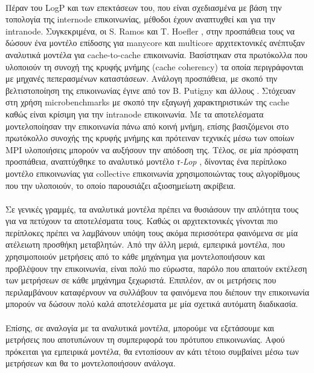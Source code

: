 \paragraph{}
Πέραν του LogP και των επεκτάσεων του, που είναι σχεδιασμένα με βάση την τοπολογία της internode επικοινωνίας, μέθοδοι έχουν αναπτυχθεί και για την intranode. Συγκεκριμένα, οι S. Ramos και T. Hoefler \cite{ramos2013modeling}, στην προσπάθεια τους να δώσουν ένα μοντέλο επίδοσης για manycore και multicore αρχιτεκτονικές ανέπτυξαν αναλυτικά μοντέλα για cache-to-cache επικοινωνία. Βασίστηκαν στα πρωτόκολλα που υλοποιούν τη συνοχή της κρυφής μνήμης (cache coherency) τα οποία περιγράφονται με μηχανές πεπερασμένων καταστάσεων. Ανάλογη προσπάθεια, με σκοπό την βελτιστοποίηση της επικοινωνίας έγινε από τον Β. Putigny και άλλους \cite{putigny}. Στόχευαν στη χρήση microbenchmarks με σκοπό την εξαγωγή χαρακτηριστικών της cache καθώς είναι κρίσιμη για την intranode επικοινωνία. Με τα αποτελέσματα μοντελοποίησαν την επικοινωνία πάνω από κοινή μνήμη, επίσης βασιζόμενοι στο πρωτόκολλο συνοχής της κρυφής μνήμης και πρότειναν τεχνικές μέσω των οποίων MPI υλοποιήσεις μπορούν να αυξήσουν την απόδοση της. Τέλος, σε μία πρόσφατη προσπάθεια, αναπτύχθηκε το αναλυτικό μοντέλο \textit{τ-Lop} \cite{tlop}, δίνοντας ένα περίπλοκο μοντέλο επικοινωνίας για collective επικοινωνία χρησιμοποιώντας τους αλγορίθμους που την υλοποιούν, το οποίο παρουσιάζει αξιοσημείωτη ακρίβεια. 

\paragraph{}
Σε γενικές γραμμές, τα αναλυτικά μοντέλα πρέπει να θυσιάσουν την απλότητα τους για να πετύχουν τα αποτελέσματα τους. Καθώς οι αρχιτεκτονικές γίνονται πιο περίπλοκες πρέπει να λαμβάνουν υπόψη τους ακόμα περισσότερα φαινόμενα σε μία ατέλειωτη προσθήκη μεταβλητών. Από την άλλη μεριά, εμπειρικά μοντέλα, που χρησιμοποιούν μετρήσεις από το κάθε μηχάνημα για μοντελοποιήσουν και προβλέψουν την επικοινωνία,  είναι πολύ πιο εύρωστα, παρόλο που απαιτούν εκτέλεση των μετρήσεων σε κάθε μηχάνημα ξεχωριστά. Επιπλέον, αν οι μετρήσεις που περιλαμβάνουν καταφέρνουν να συλλάβουν τα φαινόμενα που διέπουν την επικοινωνία μπορούν να δώσουν πολύ καλά αποτελέσματα με μία σχετικά αυτόματη διαδικασία.
\paragraph{}
Επίσης, σε αναλογία με τα αναλυτικά μοντέλα, μπορούμε να εξετάσουμε και μετρήσεις που αποτυπώνουν τη συμπεριφορά του πρότυπου επικοινωνίας. Αφού πρόκειται για εμπειρικά μοντέλα, θα εντοπίσουν αν κάτι τέτοιο συμβαίνει μέσω των μετρήσεων και θα το μοντελοποιήσουν ανάλογα. 
